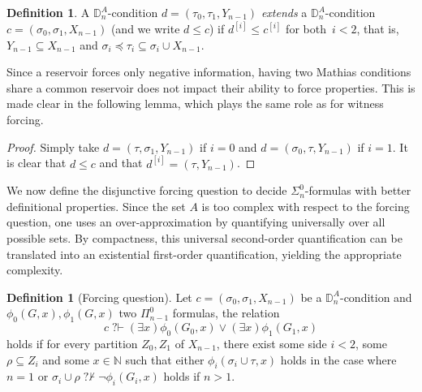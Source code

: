 \documentclass{article}
\def\NN{\mathbb{N}}
\def\PP{\mathbb{P}}
\def\DD{\mathbb{D}}
\def\PP{\mathbb{P}}
\newcommand{\qvdash}{\operatorname{{?}{\vdash}}}
\newcommand{\nqvdash}{\operatorname{{?}{\nvdash}}}
\numberwithin{theorem}{section}
\newtheorem{lemma}[theorem]{Lemma}
\theoremstyle{definition}
\newtheorem{definition}[theorem]{Definition}
\begin{document}
\begin{definition}
A $\DD_{n}^A$-condition $d = (\tau_0, \tau_1, Y_{n-1})$ \emph{extends} a $\DD_{n}^A$-condition $c = (\sigma_0, \sigma_1, X_{n-1})$ (and we write $d \leq c$) if $d^{[i]} \leq c^{[i]}$ for both~$i < 2$, that is, $Y_{n-1} \subseteq X_{n-1}$ and $\sigma_i \preceq \tau_i \subseteq \sigma_i \cup X_{n-1}$.
\end{definition}

Since a reservoir forces only negative information, having two Mathias condi\-tions share a common reservoir does not impact their ability to force properties. This is made clear in the following lemma, which plays the same role as  for witness forcing.


\begin{proof}
Simply take $d = (\tau,\sigma_1,Y_{n-1})$ if $i = 0$ and $d = (\sigma_0,\tau,Y_{n-1})$ if $i = 1$. It is clear that $d \leq c$ and that $d^{[i]} = (\tau, Y_{n-1})$.
\end{proof}

We now define the disjunctive forcing question to decide $\Sigma^0_n$-formulas with better definitional properties.
Since the set $A$ is too complex with respect to the forcing question, one uses an over-approximation by quantifying universally over all possible sets. By compactness, this universal second-order quantification can be translated into an existential first-order quantification, yielding the appropriate complexity.

\begin{definition}[Forcing question]
Let $c = (\sigma_0, \sigma_1,X_{n-1})$ be a $\DD_{n}^A$-condition and $\phi_{0}(G,x), \phi_1(G,x)$ two $\Pi_{n-1}^0$ formulas, the relation $$c \qvdash (\exists x)\phi_0(G_0,x) \vee (\exists x)\phi_1(G_1,x)$$
holds if for every partition $Z_0,Z_1$ of $X_{n-1}$, there exist some side $i < 2$, some $\rho \subseteq Z_i$ and some $x \in \NN$ such that either $\phi_i(\sigma_i \cup \tau,x)$ holds in the case where $n = 1$ or $\sigma_i \cup \rho \nqvdash \neg \phi_{i}(G_i,x)$ holds if $n > 1$.
\end{definition}
\end{document}
